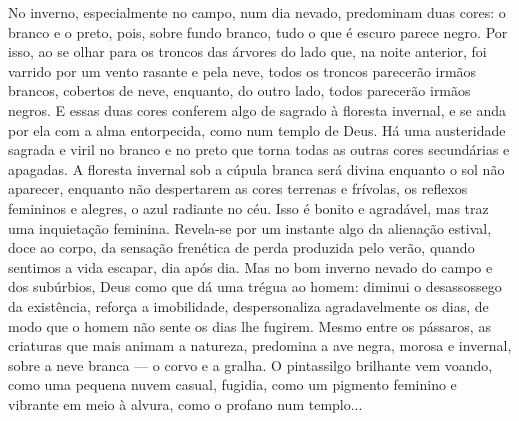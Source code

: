 No inverno, especialmente no campo, num dia nevado, predominam duas
cores: o branco e o preto, pois, sobre fundo branco, tudo o que é escuro
parece negro. Por isso, ao se olhar para os troncos das árvores do lado
que, na noite anterior, foi varrido por um vento rasante e pela neve,
todos os troncos parecerão irmãos brancos, cobertos de neve, enquanto,
do outro lado, todos parecerão irmãos negros. E essas duas cores
conferem algo de sagrado à floresta invernal, e se anda por ela com a
alma entorpecida, como num templo de Deus. Há uma austeridade sagrada e
viril no branco e no preto que torna todas as outras cores secundárias e
apagadas. A floresta invernal sob a cúpula branca será divina enquanto o
sol não aparecer, enquanto não despertarem as cores terrenas e frívolas,
os reflexos femininos e alegres, o azul radiante no céu. Isso é bonito e
agradável, mas traz uma inquietação feminina. Revela-se por um instante
algo da alienação estival, doce ao corpo, da sensação frenética de perda
produzida pelo verão, quando sentimos a vida escapar, dia após dia. Mas
no bom inverno nevado do campo e dos subúrbios, Deus como que dá uma
trégua ao homem: diminui o desassossego da existência, reforça a
imobilidade, despersonaliza agradavelmente os dias, de modo que o homem
não sente os dias lhe fugirem. Mesmo entre os pássaros, as criaturas que
mais animam a natureza, predomina a ave negra, morosa e invernal, sobre
a neve branca --- o corvo e a gralha. O pintassilgo brilhante vem
voando, como uma pequena nuvem casual, fugidia, como um pigmento
feminino e vibrante em meio à alvura, como o profano num templo...


